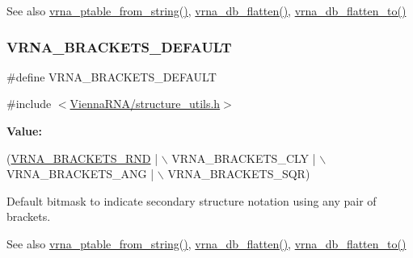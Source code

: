\begin{DoxySeeAlso}{See also}
\hyperlink{group__struct__utils_gac76c9ef3de507748fb0416a59323362b}{vrna\+\_\+ptable\+\_\+from\+\_\+string()}, \hyperlink{group__struct__utils_gae966b9f44168a4f4b39ca42ffb5f37b7}{vrna\+\_\+db\+\_\+flatten()}, \hyperlink{group__struct__utils_ga690425199c8b71545e7196e3af1436f8}{vrna\+\_\+db\+\_\+flatten\+\_\+to()} 
\end{DoxySeeAlso}
\mbox{\label{group__struct__utils_ga559ebf76b1b289f85309f4206e99aa1a}} 
\subsubsection{\texorpdfstring{V\+R\+N\+A\+\_\+\+B\+R\+A\+C\+K\+E\+T\+S\+\_\+\+D\+E\+F\+A\+U\+LT}{VRNA\_BRACKETS\_DEFAULT}}
{\footnotesize\ttfamily \#define V\+R\+N\+A\+\_\+\+B\+R\+A\+C\+K\+E\+T\+S\+\_\+\+D\+E\+F\+A\+U\+LT}



{\ttfamily \#include $<$\hyperlink{structure__utils_8h}{Vienna\+R\+N\+A/structure\+\_\+utils.\+h}$>$}

{\bfseries Value\+:}
\begin{DoxyCode}
(\hyperlink{group__struct__utils_gac92d5fa7c6625bce2670ece510a24fbd}{VRNA\_BRACKETS\_RND} | \(\backslash\)
   VRNA\_BRACKETS\_CLY | \(\backslash\)
   VRNA\_BRACKETS\_ANG | \(\backslash\)
   VRNA\_BRACKETS\_SQR)
\end{DoxyCode}


Default bitmask to indicate secondary structure notation using any pair of brackets. 

\begin{DoxySeeAlso}{See also}
\hyperlink{group__struct__utils_gac76c9ef3de507748fb0416a59323362b}{vrna\+\_\+ptable\+\_\+from\+\_\+string()}, \hyperlink{group__struct__utils_gae966b9f44168a4f4b39ca42ffb5f37b7}{vrna\+\_\+db\+\_\+flatten()}, \hyperlink{group__struct__utils_ga690425199c8b71545e7196e3af1436f8}{vrna\+\_\+db\+\_\+flatten\+\_\+to()} 
\end{DoxySeeAlso}



